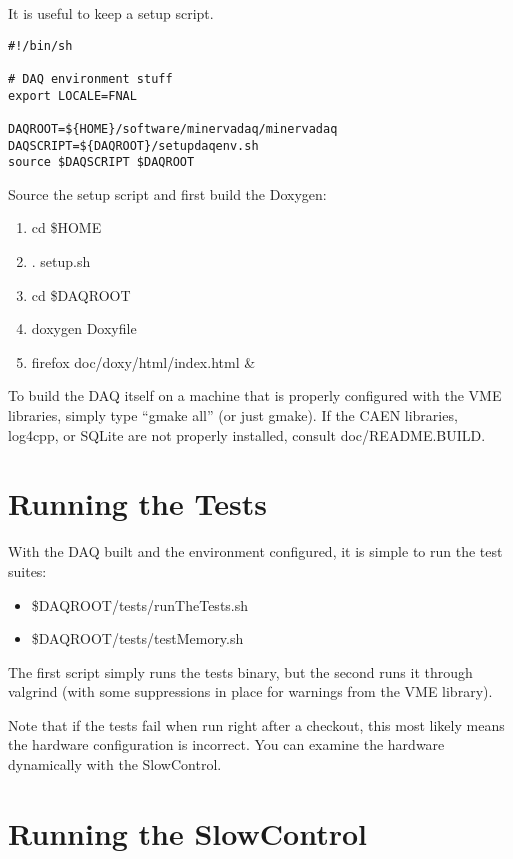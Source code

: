 It is useful to keep a setup script.

\begin{verbatim}
#!/bin/sh

# DAQ environment stuff
export LOCALE=FNAL

DAQROOT=${HOME}/software/minervadaq/minervadaq
DAQSCRIPT=${DAQROOT}/setupdaqenv.sh
source $DAQSCRIPT $DAQROOT
\end{verbatim}

Source the setup script and first build the Doxygen:

\begin{enumerate}
\item cd \$HOME
\item . setup.sh
\item cd \$DAQROOT
\item doxygen Doxyfile
\item firefox doc/doxy/html/index.html \&
\end{enumerate}

To build the DAQ itself on a machine that is properly configured with the VME libraries, simply type ``gmake all'' (or just gmake). If the CAEN libraries, log4cpp, or SQLite are not properly installed, consult doc/README.BUILD.

\section{Running the Tests}

With the DAQ built and the environment configured, it is simple to run the test suites:

\begin{itemize}
\item \$DAQROOT/tests/runTheTests.sh
\item \$DAQROOT/tests/testMemory.sh
\end{itemize}

The first script simply runs the tests binary, but the second runs it through valgrind (with some suppressions in place for warnings from the VME library).

Note that if the tests fail when run right after a checkout, this most likely means the hardware configuration is incorrect. You can examine the hardware dynamically with the SlowControl.

\section{Running the SlowControl}

